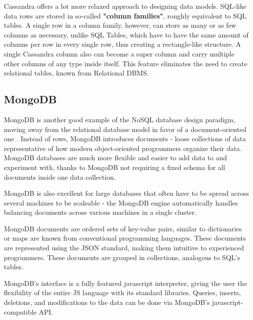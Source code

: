 \par Cassandra offers a lot more relaxed approach to designing data models. SQL-like data rows are stored in so-called \textbf{"column families"}, roughly equivalent to SQL tables. A single row in a column family, however, can store as many or as few columns as necessary, unlike SQL Tables, which have to have the same amount of columns per row in every single row, thus creating a rectangle-like structure. A single Cassandra column also can become a super column and carry multiple other columns of any type inside itself. This feature eliminates the need to create relational tables, known from Relational DBMS\citep{HewittCassandra}.

\subsection{MongoDB}
\label{subsec:background:second_section:second_subsection}
\par MongoDB is another good example of the NoSQL database design paradigm, moving away from the relational database model in favor of a document-oriented one \citep{mongoDB}. Instead of rows, MongoDB introduces documents - loose collections of data representative of how modern object-oriented programmers organize their data. MongoDB databases are much more flexible and easier to add data to and experiment with, thanks to MongoDB not requiring a fixed schema for all documents inside one data collection.
%
\par MongoDB is also excellent for large databases that often have to be spread across several machines to be scaleable - the MongoDB engine automatically handles balancing documents across various machines in a single cluster\citep{mongoDB}. 

\par MongoDB documents are ordered sets of key-value pairs, similar to dictionaries or maps are known from conventional programming languages. These documents are represented using the JSON standard, making them intuitive to experienced programmers. These documents are grouped in collections, analogous to SQL's tables\citep{mongoDB}. 

\par MongoDB's interface is a fully featured javascript interpreter, giving the user the flexibility of the entire JS language with its standard libraries. Queries, inserts, deletions, and modifications to the data can be done via MongoDB's javascript-compatible API\citep{mongoDB}.

